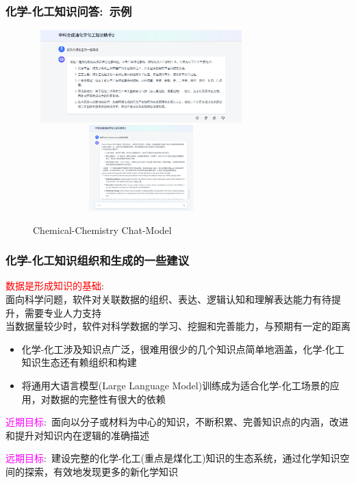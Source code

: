 \begin{frame}
	\frametitle{化学-化工知识问答:~示例}	
\begin{figure}[h!]
\centering
\vskip -8pt
\includegraphics[height=1.40in,width=3.30in,viewport=0 0 978 447,clip]{Figures/Allma_MaxKB-1.png}
\includegraphics[height=1.30in,width=3.30in,viewport=0 342 924 759,clip]{Figures/Allma_MaxKB-2.png}
\caption{\tiny\textrm{Chemical-Chemistry Chat-Model}}%
\label{Fig:MaxKB_Chat-Model-2}
\end{figure}
\end{frame}
%
\frame
{
	\frametitle{化学-化工知识组织和生成的一些建议}
	\textcolor{red}{数据是形成知识的基础}:~\\
	面向科学问题，软件对关联数据的组织、表达、逻辑认知和理解表达能力有待提升，需要专业人力支持\\
	当数据量较少时，软件对科学数据的学习、挖掘和完善能力，与预期有一定的距离
	\begin{itemize}
		\item 化学-化工涉及知识点广泛，很难用很少的几个知识点简单地涵盖，化学-化工知识生态还有赖组织和构建
		\item 将通用大语言模型\textrm{(Large Language Model)}训练成为适合化学-化工场景的应用，对数据的完整性有很大的依赖
	\end{itemize}
	\textcolor{magenta}{近期目标}:~面向以分子或材料为中心的知识，不断积累、完善知识点的内涵，改进和提升对知识内在逻辑的准确描述

\textcolor{magenta}{远期目标}:~建设完整的化学-化工(重点是煤化工)知识的生态系统，通过化学知识空间的探索，有效地发现更多的新化学知识
}
